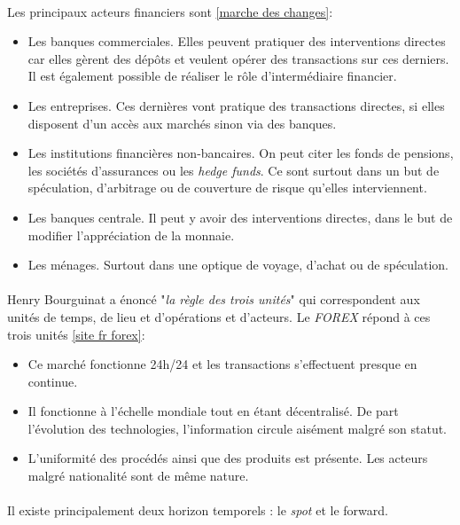 \documentclass[a4paper, 11pt]{article}
\begin{document}
\paragraph{}
Les principaux acteurs financiers sont \ref{marche des changes}:
\begin{itemize}
\item Les banques commerciales. Elles peuvent pratiquer des interventions directes car elles gèrent des dépôts et veulent opérer des transactions sur ces derniers. Il est également possible de réaliser le rôle d'intermédiaire financier.
\item Les entreprises. Ces dernières vont pratique des transactions directes, si elles disposent d'un accès aux marchés sinon via des banques.
\item Les institutions financières non-bancaires. On peut citer les fonds de pensions, les sociétés d'assurances ou les \textit{hedge funds}. Ce sont surtout dans un but de spéculation, d'arbitrage ou de couverture de risque qu'elles interviennent.
\item Les banques centrale. Il peut y avoir des interventions directes, dans le but de modifier l'appréciation de la monnaie.
\item Les ménages. Surtout dans une optique de voyage, d'achat ou de spéculation.
\end{itemize}

\paragraph{}
Henry Bourguinat a énoncé "\textit{la règle des trois unités}" qui correspondent aux unités de temps, de lieu et d'opérations et d'acteurs.
Le \textit{FOREX} répond à ces trois unités \ref{site fr forex}:
\begin{itemize}
\item Ce marché fonctionne 24h/24 et les transactions s'effectuent presque en continue.
\item Il fonctionne à l'échelle mondiale tout en étant décentralisé. De part l'évolution des technologies, l'information circule aisément malgré son statut.
\item L'uniformité des procédés ainsi que des produits est présente. Les acteurs malgré nationalité sont de même nature.
\end{itemize}

\paragraph{}
Il existe principalement deux horizon temporels : le \textit{spot} et le {forward}.
\end{document}
